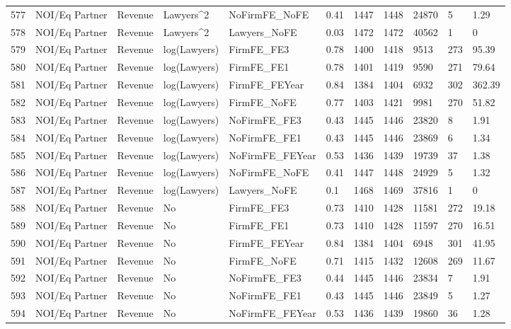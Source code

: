 \documentclass{article}
\begin{document}
\begin{table}[H]
\begin{tabular}{rllllllllll}
  577 & NOI/Eq Partner & Revenue & Lawyers^2 & NoFirmFE\_NoFE & 0.41 & 1447 & 1448 & 24870 & 5 & 1.29 \\ 
  578 & NOI/Eq Partner & Revenue & Lawyers^2 & Lawyers\_NoFE & 0.03 & 1472 & 1472 & 40562 & 1 & 0 \\ 
  579 & NOI/Eq Partner & Revenue & log(Lawyers) & FirmFE\_FE3 & 0.78 & 1400 & 1418 & 9513 & 273 & 95.39 \\ 
  580 & NOI/Eq Partner & Revenue & log(Lawyers) & FirmFE\_FE1 & 0.78 & 1401 & 1419 & 9590 & 271 & 79.64 \\ 
  581 & NOI/Eq Partner & Revenue & log(Lawyers) & FirmFE\_FEYear & 0.84 & 1384 & 1404 & 6932 & 302 & 362.39 \\ 
  582 & NOI/Eq Partner & Revenue & log(Lawyers) & FirmFE\_NoFE & 0.77 & 1403 & 1421 & 9981 & 270 & 51.82 \\ 
  583 & NOI/Eq Partner & Revenue & log(Lawyers) & NoFirmFE\_FE3 & 0.43 & 1445 & 1446 & 23820 & 8 & 1.91 \\ 
  584 & NOI/Eq Partner & Revenue & log(Lawyers) & NoFirmFE\_FE1 & 0.43 & 1445 & 1446 & 23869 & 6 & 1.34 \\ 
  585 & NOI/Eq Partner & Revenue & log(Lawyers) & NoFirmFE\_FEYear & 0.53 & 1436 & 1439 & 19739 & 37 & 1.38 \\ 
  586 & NOI/Eq Partner & Revenue & log(Lawyers) & NoFirmFE\_NoFE & 0.41 & 1447 & 1448 & 24929 & 5 & 1.32 \\ 
  587 & NOI/Eq Partner & Revenue & log(Lawyers) & Lawyers\_NoFE & 0.1 & 1468 & 1469 & 37816 & 1 & 0 \\ 
  588 & NOI/Eq Partner & Revenue & No & FirmFE\_FE3 & 0.73 & 1410 & 1428 & 11581 & 272 & 19.18 \\ 
  589 & NOI/Eq Partner & Revenue & No & FirmFE\_FE1 & 0.73 & 1410 & 1428 & 11597 & 270 & 16.51 \\ 
  590 & NOI/Eq Partner & Revenue & No & FirmFE\_FEYear & 0.84 & 1384 & 1404 & 6948 & 301 & 41.95 \\ 
  591 & NOI/Eq Partner & Revenue & No & FirmFE\_NoFE & 0.71 & 1415 & 1432 & 12608 & 269 & 11.67 \\ 
  592 & NOI/Eq Partner & Revenue & No & NoFirmFE\_FE3 & 0.44 & 1445 & 1446 & 23834 & 7 & 1.91 \\ 
  593 & NOI/Eq Partner & Revenue & No & NoFirmFE\_FE1 & 0.43 & 1445 & 1446 & 23849 & 5 & 1.27 \\ 
  594 & NOI/Eq Partner & Revenue & No & NoFirmFE\_FEYear & 0.53 & 1436 & 1439 & 19860 & 36 & 1.28 \\ 

\end{tabular}
\end{table}
\end{document}
